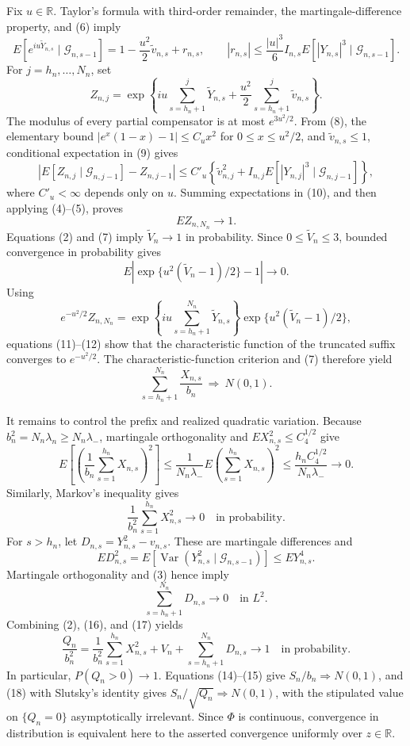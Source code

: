 Fix \(u\in\mathbb R\).  Taylor's formula with third-order remainder, the martingale-difference property, and (6) imply
\[
E[e^{iu\widetilde Y_{n,s}}\mid\mathcal G_{n,s-1}]
=1-\frac{u^2}{2}\widetilde v_{n,s}+r_{n,s},
\qquad
|r_{n,s}|\le\frac{|u|^3}{6}I_{n,s}
E[|Y_{n,s}|^3\mid\mathcal G_{n,s-1}].
\tag{8}
\]
For \(j=h_n,\ldots,N_n\), set
\[
Z_{n,j}=\exp\!\left\{iu\sum_{s=h_n+1}^{j}\widetilde Y_{n,s}
+\frac{u^2}{2}\sum_{s=h_n+1}^{j}\widetilde v_{n,s}\right\}.
\tag{9}
\]
The modulus of every partial compensator is at most \(e^{3u^2/2}\).  From (8), the elementary bound
\( |e^x(1-x)-1|\le C_u x^2 \) for \(0\le x\le u^2/2\), and \(\widetilde v_{n,s}\le1\), conditional expectation in (9) gives
\[
\left|E[Z_{n,j}\mid\mathcal G_{n,j-1}]-Z_{n,j-1}\right|
\le C'_u\left\{\widetilde v_{n,j}^2+
I_{n,j}E[|Y_{n,j}|^3\mid\mathcal G_{n,j-1}]\right\},
\tag{10}
\]
where \(C'_u<\infty\) depends only on \(u\).  Summing expectations in (10), and then applying (4)--(5), proves
\[
E Z_{n,N_n}\longrightarrow1.
\tag{11}
\]
Equations (2) and (7) imply \(\widetilde V_n\to1\) in probability.  Since \(0\le\widetilde V_n\le3\), bounded convergence in probability gives
\[
E\left|\exp\{u^2(\widetilde V_n-1)/2\}-1\right|\longrightarrow0.
\tag{12}
\]
Using
\[
e^{-u^2/2}Z_{n,N_n}
=\exp\!\left\{iu\sum_{s=h_n+1}^{N_n}\widetilde Y_{n,s}\right\}
\exp\{u^2(\widetilde V_n-1)/2\},
\tag{13}
\]
equations (11)--(12) show that the characteristic function of the truncated suffix converges to \(e^{-u^2/2}\).  The characteristic-function criterion and (7) therefore yield
\[
\sum_{s=h_n+1}^{N_n}\frac{X_{n,s}}{b_n}\ \Rightarrow\ N(0,1).
\tag{14}
\]

It remains to control the prefix and realized quadratic variation.  Because \(b_n^2=N_n\lambda_n\ge N_n\lambda_-\), martingale orthogonality and \(E X_{n,s}^2\le C_4^{1/2}\) give
\[
E\left[\left(\frac1{b_n}\sum_{s=1}^{h_n}X_{n,s}\right)^2\right]
\le\frac{1}{N_n\lambda_-}E\left(\sum_{s=1}^{h_n}X_{n,s}\right)^2
\le\frac{h_nC_4^{1/2}}{N_n\lambda_-}\longrightarrow0.
\tag{15}
\]
Similarly, Markov's inequality gives
\[
\frac1{b_n^2}\sum_{s=1}^{h_n}X_{n,s}^2\longrightarrow0
\quad\text{in probability}.
\tag{16}
\]
For \(s>h_n\), let \(D_{n,s}=Y_{n,s}^2-v_{n,s}\).  These are martingale differences and
\[
E D_{n,s}^2
=E\!\left[\operatorname{Var}(Y_{n,s}^2\mid\mathcal G_{n,s-1})\right]
\le E Y_{n,s}^4.
\]
Martingale orthogonality and (3) hence imply
\[
\sum_{s=h_n+1}^{N_n}D_{n,s}\longrightarrow0
\quad\text{in }L^2.
\tag{17}
\]
Combining (2), (16), and (17) yields
\[
\frac{Q_n}{b_n^2}
=\frac1{b_n^2}\sum_{s=1}^{h_n}X_{n,s}^2+V_n
+\sum_{s=h_n+1}^{N_n}D_{n,s}
\longrightarrow1
\quad\text{in probability}.
\tag{18}
\]
In particular, \(P(Q_n>0)\to1\).  Equations (14)--(15) give \(S_n/b_n\Rightarrow N(0,1)\), and (18) with Slutsky's identity gives \(S_n/\sqrt{Q_n}\Rightarrow N(0,1)\), with the stipulated value on \(\{Q_n=0\}\) asymptotically irrelevant.  Since \(\Phi\) is continuous, convergence in distribution is equivalent here to the asserted convergence uniformly over \(z\in\mathbb R\).

